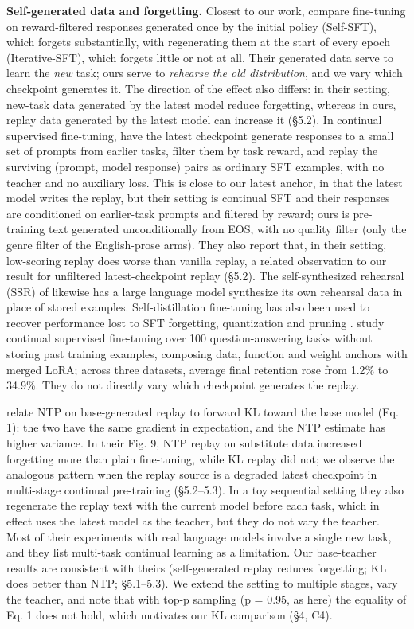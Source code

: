 \documentclass[11pt]{article}
\begin{document}
\textbf{Self-generated data and forgetting.} Closest to our work, \citet[\emph{Retaining by Doing}]{chen2026retaining} compare fine-tuning on reward-filtered responses generated once by the initial policy (Self-SFT), which forgets substantially, with regenerating them at the start of every epoch (Iterative-SFT), which forgets little or not at all. Their generated data serve to learn the \emph{new} task; ours serve to \emph{rehearse the old distribution}, and we vary which checkpoint generates it. The direction of the effect also differs: in their setting, new-task data generated by the latest model reduce forgetting, whereas in ours, replay data generated by the latest model can increase it (§5.2). In continual supervised fine-tuning, \citet[\emph{On-Policy Replay}]{chen2026onpolicy} have the latest checkpoint generate responses to a small set of prompts from earlier tasks, filter them by task reward, and replay the surviving (prompt, model response) pairs as ordinary SFT examples, with no teacher and no auxiliary loss. This is close to our latest anchor, in that the latest model writes the replay, but their setting is continual SFT and their responses are conditioned on earlier-task prompts and filtered by reward; ours is pre-training text generated unconditionally from EOS, with no quality filter (only the genre filter of the English-prose arms). They also report that, in their setting, low-scoring replay does worse than vanilla replay, a related observation to our result for unfiltered latest-checkpoint replay (§5.2). The self-synthesized rehearsal (SSR) of \citet{huang2024} likewise has a large language model synthesize its own rehearsal data in place of stored examples. Self-distillation fine-tuning has also been used to recover performance lost to SFT forgetting, quantization and pruning \citep{liu2026}. \citet{zhang2026} study continual supervised fine-tuning over 100 question-answering tasks without storing past training examples, composing data, function and weight anchors with merged LoRA; across three datasets, average final retention rose from 1.2\% to 34.9\%. They do not directly vary which checkpoint generates the replay.

\citet{marek2026} relate NTP on base-generated replay to forward KL toward the base model (Eq. 1): the two have the same gradient in expectation, and the NTP estimate has higher variance. In their Fig. 9, NTP replay on substitute data increased forgetting more than plain fine-tuning, while KL replay did not; we observe the analogous pattern when the replay source is a degraded latest checkpoint in multi-stage continual pre-training (§5.2–5.3). In a toy sequential setting they also regenerate the replay text with the current model before each task, which in effect uses the latest model as the teacher, but they do not vary the teacher. Most of their experiments with real language models involve a single new task, and they list multi-task continual learning as a limitation. Our base-teacher results are consistent with theirs (self-generated replay reduces forgetting; KL does better than NTP; §5.1–5.3). We extend the setting to multiple stages, vary the teacher, and note that with top-p sampling (p = 0.95, as here) the equality of Eq. 1 does not hold, which motivates our KL comparison (§4, C4).
\end{document}
